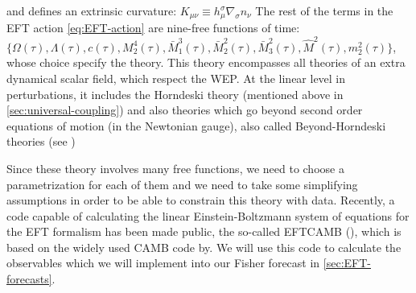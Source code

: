 and defines an extrinsic curvature:
\beeqp$
K_{\mu \nu} \equiv h^{\sigma}_{\mu} \nabla_{\sigma} n_\nu
$
The rest of the terms in the EFT action \cref{eq:EFT-action} are nine-free functions of time:\\
$\{\Omega(\tau), \Lambda(\tau), c(\tau), M_{2}^4 (\tau), \bar{M}_{1}^3 (\tau), \bar{M}_2^2 (\tau), \bar{M}_3^2 (\tau),
 \hat{M}^2 (\tau), m^2_2(\tau)\}$, whose choice specify the theory.
This theory encompasses all theories of an extra dynamical scalar field, which respect the WEP.
At the linear level in perturbations, it includes the Horndeski theory (mentioned above in \cref{sec:universal-coupling}) 
and also theories which go beyond second order equations of motion (in the Newtonian gauge), also called
Beyond-Horndeski theories (see \cite{Gleyzes2016, Piazza, Bellini})

Since these theory involves many free functions, we need to choose a parametrization for each of them and 
we need to take some simplifying assumptions in order to be able to constrain this theory with data.
Recently, a code capable of calculating the linear Einstein-Boltzmann system of equations for the EFT formalism
has been made public, the so-called \textsc{EFTCAMB} (\cite{Hu, Raveri, Silvestri}), which is based 
on the widely used \textsc{CAMB} code by\cite{lewis_efficient_2000}. 
We will use this code to calculate the observables which we will 
implement into our Fisher forecast in \cref{sec:EFT-forecasts}.

